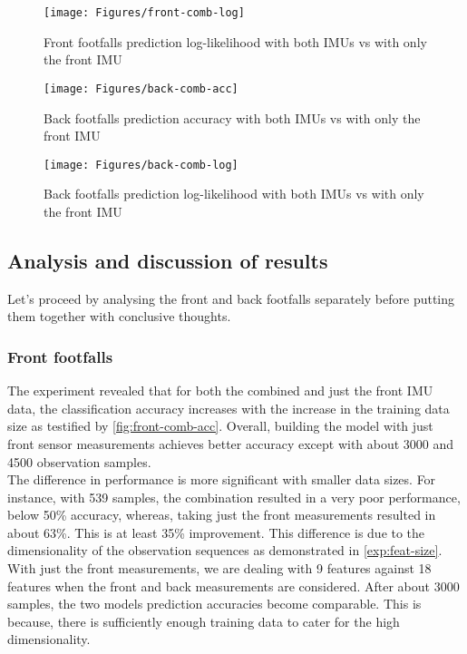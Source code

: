 \begin{figure}[ht!]
	\texttt{[image: Figures/front-comb-log]}
	\caption{Front footfalls prediction log-likelihood with both IMUs vs with only the front IMU}
	\label{fig:front-comb-log}
\end{figure}

\begin{figure}[ht!]
	\texttt{[image: Figures/back-comb-acc]}
	\caption{Back footfalls prediction accuracy with both IMUs vs with only the front IMU}
	\label{fig:back-comb-acc}
\end{figure}

\begin{figure}[ht!]
	\texttt{[image: Figures/back-comb-log]}
	\caption{Back footfalls prediction log-likelihood with both IMUs vs with only the front IMU}
	\label{fig:back-comb-log}
\end{figure}


\subsection{Analysis and discussion of results}

Let's proceed by analysing the front and back footfalls separately before putting them together with conclusive thoughts.

\subsubsection{Front footfalls}
The experiment revealed that for both the combined and just the front IMU data, the classification accuracy increases with the increase in the training data size as testified by \ref{fig:front-comb-acc}. Overall, building the model with just front sensor measurements achieves better accuracy except with about 3000 and 4500 observation samples.\\
The difference in performance is more significant with smaller data sizes. For instance, with 539 samples, the combination resulted in a very poor performance, below 50\% accuracy, whereas, taking just the front measurements resulted in about 63\%. This is at least 35\% improvement.
This difference is due to the dimensionality of the observation sequences as demonstrated in \ref{exp:feat-size}. With just the front measurements, we are dealing with 9 features against 18 features when the front and back measurements are considered.
After about 3000 samples, the two models prediction accuracies become comparable. This is because, there is sufficiently enough training data to cater for the high dimensionality.\\\\

